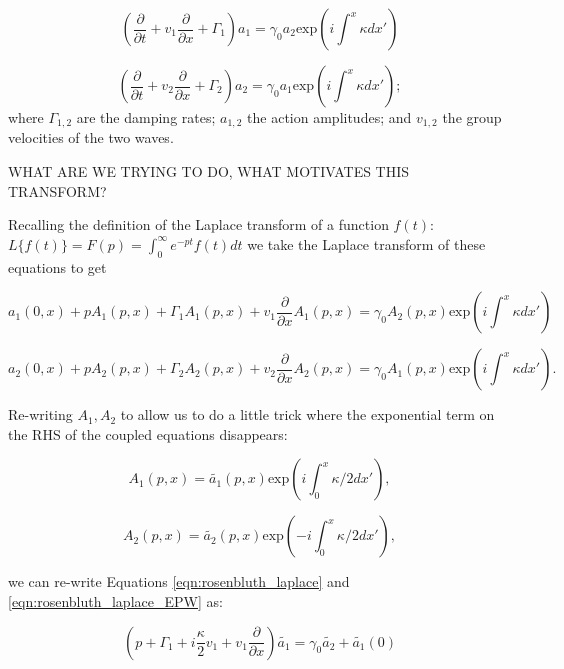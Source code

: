 \begin{equation}
 \left(\frac{\partial}{\partial t} + v_1\frac{\partial}{\partial x} + \Gamma_1 \right)a_1 = \gamma_0a_2\text{exp}\left(i\int^x \kappa dx'\right)
\end{equation}

\begin{equation}
 \left(\frac{\partial}{\partial t} + v_2\frac{\partial}{\partial x} + \Gamma_2 \right)a_2 = \gamma_0a_1\text{exp}\left(i\int^x \kappa dx'\right);
\end{equation} 
where $\Gamma_{1,2}$ are the damping rates; $a_{1,2}$ the action amplitudes; and $v_{1,2}$ the group velocities of the two waves. 

WHAT ARE WE TRYING TO DO, WHAT MOTIVATES THIS TRANSFORM?

Recalling the definition of the Laplace transform of a function $f(t)$: $L\{f(t)\}= F(p) = \int_0^\infty e^{-pt} f(t) dt$ we take the Laplace transform of these equations to get

\begin{equation}\label{eqn:rosenbluth_laplace}
a_1(0,x) + pA_1(p,x) + \Gamma_1 A_1(p,x) + v_1\frac{\partial}{\partial x}A_1(p,x) = \gamma_0 A_2(p,x)\text{exp}\left(i\int^x \kappa dx'\right)
\end{equation}

\begin{equation}\label{eqn:rosenbluth_laplace_EPW}
a_2(0,x) + pA_2(p,x) + \Gamma_2 A_2(p,x) + v_2\frac{\partial}{\partial x}A_2(p,x) = \gamma_0 A_1(p,x)\text{exp}\left(i\int^x \kappa dx'\right).
\end{equation}

Re-writing $A_1,A_2$ to allow us to do a little trick where the exponential term on the RHS of the coupled equations disappears:  

\begin{equation}
 A_1(p,x) = \tilde{a_1}(p,x)\text{exp}\left(i\int_0^x \kappa/2 dx'\right),
\end{equation}

\begin{equation}
 A_2(p,x) = \tilde{a_2}(p,x)\text{exp}\left(-i\int_0^x \kappa/2 dx'\right),
\end{equation}

 we can re-write Equations \ref{eqn:rosenbluth_laplace} and \ref{eqn:rosenbluth_laplace_EPW} as:

\begin{equation}\label{eqn:rosenbluth_solveable_EMW}
	\left(p + \Gamma_1 + i\frac{\kappa}{2}v_1 + v_1\frac{\partial}{\partial x}\right)\tilde{a_1} = \gamma_0 \tilde{a_2} + \tilde{a_1}(0)
\end{equation}  

